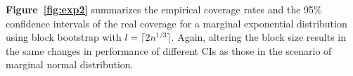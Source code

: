 \documentclass[10pt]{article}
\begin{document}
\textbf{Figure~\ref{fig:exp2}} 
summarizes the empirical coverage rates and the 95\% confidence intervals of the 
real coverage for a marginal exponential distribution using block bootstrap
with $l = \lceil 2n^{1/3} \rceil$. Again, altering the block size results in the same
changes in performance of different CIs as those in the scenario of
marginal normal distribution.
 


\end{document}
